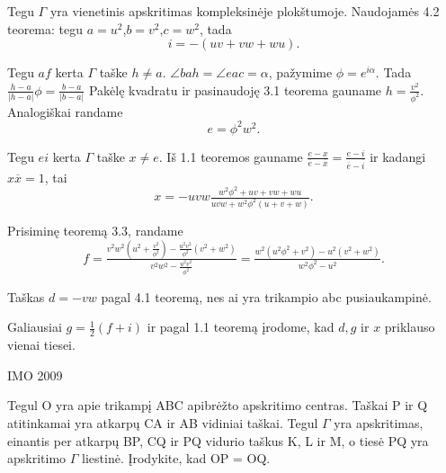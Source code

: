 \begin{sprendimas}

Tegu $\Gamma$ yra vienetinis apskritimas kompleksinėje plokštumoje. Naudojamės 4.2 teorema: tegu $a=u^2$,$b=v^2$,$c=w^2$, tada 
\begin{equation*}
i = -(uv+vw+wu).
\end{equation*}

Tegu $af$ kerta $\Gamma$ taške $h\ne a$. $\angle bah =\angle eac =\alpha$, pažymime $\phi=e^{i\alpha}$. Tada $\frac{h-a}{|h-a|}\phi=\frac{b-a}{|b-a|}$ Pakėlę kvadratu ir pasinaudoję 3.1 teorema gauname $h=\frac{v^2}{\phi^2}$. Analogiškai randame 
\begin{equation*}
e=\phi^2w^2.
\end{equation*}

Tegu $ei$ kerta $\Gamma$ taške $x \ne e$. Iš 1.1 teoremos gauname $\frac{e-x}{\overline{e}-\overline{x}}=\frac{e-i}{\overline{e}-\overline{i}}$ ir kadangi $x\overline{x}=1$, tai 
\begin{equation*}
x=-uvw\tfrac{w^2\phi ^2 +uv+vw+wu}{uvw +w^2\phi ^2(u+v+w)}.
\end{equation*}

Prisiminę teoremą 3.3, randame 
\begin{equation*}
f=\tfrac{v^2w^2(u^2 + \frac{v^2}{\phi ^2}) - \frac{u^2v^2}{\phi ^2}(v^2+w^2)}{v^2w^2 - \frac{u^2v^2}{\phi ^2}}=\tfrac{w^2(u^2\phi^2 + v^2) - u^2(v^2+w^2)}{w^2\phi^2 - u^2}.
\end{equation*}

Taškas $d=-vw$ pagal 4.1 teoremą, nes ai yra trikampio abc pusiaukampinė.

Galiausiai $g=\frac{1}{2}(f+i)$ ir pagal 1.1 teoremą įrodome, kad $ d, g$ ir $x$ priklauso vienai tiesei.
\end{sprendimas}
\begin{pavnr}
IMO 2009

Tegul O yra apie trikampį ABC apibrėžto apskritimo
centras. Taškai P ir Q atitinkamai yra atkarpų CA ir AB vidiniai
taškai. Tegul $\Gamma$ yra apskritimas, einantis per atkarpų BP, CQ ir
PQ vidurio taškus K, L ir M, o tiesė PQ yra apskritimo $\Gamma$ liestinė.
Įrodykite, kad OP = OQ.
\end{pavnr}
